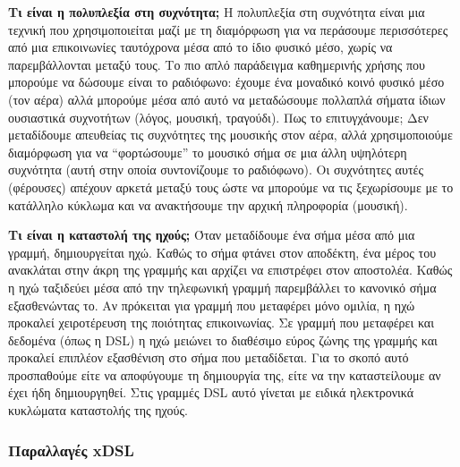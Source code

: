 \begin{inthebox}
\textbf{Τι είναι η πολυπλεξία στη συχνότητα;}
Η πολυπλεξία στη συχνότητα είναι μια τεχνική που χρησιμοποιείται μαζί με τη διαμόρφωση για να περάσουμε περισσότερες από μια επικοινωνίες ταυτόχρονα μέσα από το ίδιο φυσικό μέσο, χωρίς να παρεμβάλλονται μεταξύ τους. Το πιο απλό παράδειγμα καθημερινής χρήσης που μπορούμε να δώσουμε είναι το ραδιόφωνο: έχουμε ένα μοναδικό κοινό φυσικό μέσο (τον αέρα) αλλά μπορούμε μέσα από αυτό να μεταδώσουμε πολλαπλά σήματα ίδιων ουσιαστικά συχνοτήτων (λόγος, μουσική, τραγούδι). Πως το επιτυγχάνουμε; Δεν μεταδίδουμε απευθείας τις συχνότητες της μουσικής στον αέρα, αλλά χρησιμοποιούμε διαμόρφωση για να ``φορτώσουμε'' το μουσικό σήμα σε μια άλλη υψηλότερη συχνότητα (αυτή στην οποία συντονίζουμε το ραδιόφωνο). Οι συχνότητες αυτές (φέρουσες) απέχουν αρκετά μεταξύ τους ώστε να μπορούμε να τις ξεχωρίσουμε με το κατάλληλο κύκλωμα και να ανακτήσουμε την αρχική πληροφορία (μουσική).

\textbf{Τι είναι η καταστολή της ηχούς;}
Όταν μεταδίδουμε ένα σήμα μέσα από μια γραμμή, δημιουργείται ηχώ. Καθώς το σήμα φτάνει στον αποδέκτη, ένα μέρος του ανακλάται στην άκρη της γραμμής και αρχίζει να επιστρέφει στον αποστολέα. Καθώς η ηχώ ταξιδεύει μέσα από την τηλεφωνική γραμμή παρεμβάλλει το κανονικό σήμα εξασθενώντας το. Αν πρόκειται για γραμμή που μεταφέρει μόνο ομιλία, η ηχώ προκαλεί χειροτέρευση της ποιότητας επικοινωνίας. Σε γραμμή που μεταφέρει και δεδομένα (όπως η DSL) η ηχώ μειώνει το διαθέσιμο εύρος ζώνης της γραμμής και προκαλεί επιπλέον εξασθένιση στο σήμα που μεταδίδεται. Για το σκοπό αυτό προσπαθούμε είτε να αποφύγουμε τη δημιουργία της, είτε να την καταστείλουμε αν έχει ήδη δημιουργηθεί. Στις γραμμές DSL αυτό γίνεται με ειδικά ηλεκτρονικά κυκλώματα καταστολής της ηχούς.\\
\end{inthebox}

\subsubsection*{Παραλλαγές xDSL}

